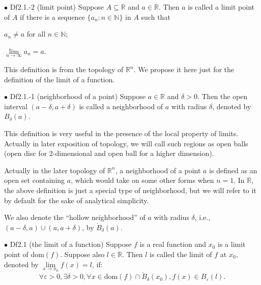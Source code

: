 \documentclass{article}
\begin{document}
\begin{Df}{$\bullet$ Df2.1.-2 (limit point)}
    Suppose $A\subseteq\mathbb{R}$ and $a\in\mathbb{R}$. Then $a$ is called a limit point of $A$ if there is a sequence $\{a_n:n\in\mathbb{N}\}$ in $A$ such that
    \begin{compactenum}
        \item $a_n\neq a$ for all $n\in\mathbb{N}$;
        \item $\lim\limits_{n\rightarrow\infty}a_n = a$.
    \end{compactenum}
\end{Df}

\begin{Rmk}{}
    This definition is from the topology of $\mathbb{R}^n$. We propose it here just for the definition of the limit of a function.
\end{Rmk}

\begin{Df}{$\bullet$ Df2.1.-1 (neighborhood of a point)}
    Suppose $a\in\mathbb{R}$ and $\delta>0$. Then the open interval $(a-\delta, a+\delta)$ is called a neighborhood of $a$ with radius $\delta$, denoted by $B_\delta(a)$.
\end{Df}

\begin{Rmk}{}
    \begin{compactitem}
        \item This definition is very useful in the presence of the local property of limits. Actually in later exposition of topology, we will call such regions as open balls (open disc for 2-dimensional and open ball for a higher dimension).
        \textcolor{Df}{\item Actually in the later topology of $\mathbb{R}^n$, a neighborhood of a point $a$ is defined as an open set containing $a$, which would take on some other forms when $n=1$. In $\mathbb{R}$, the above definition is just a special type of neighborhood, but we will refer to it by default for the sake of analytical simplicity. 
        \item We also denote the ``hollow neighborhood'' of $a$ with radius $\delta$, i.e., $(a-\delta, a)\cup(a, a+\delta)$, by $\check{B}_\delta(a)$.}
    \end{compactitem}
\end{Rmk}

\begin{Df}{$\bullet$ Df2.1 (the limit of a function)}
    Suppose $f$ is a real function and $x_0$ is a limit point of $\text{dom}(f)$. Suppose also $l\in\mathbb{R}$. Then $l$ is called the limit of $f$ at $x_0$, denoted by $\lim\limits_{x\rightarrow x_0}f(x) = l$, if:
    $$\forall\varepsilon>0, \exists\delta>0, \forall x\in\text{dom}(f)\cap\check{B}_\delta(x_0), f(x)\in B_\varepsilon(l).$$
\end{Df}
\end{document}
